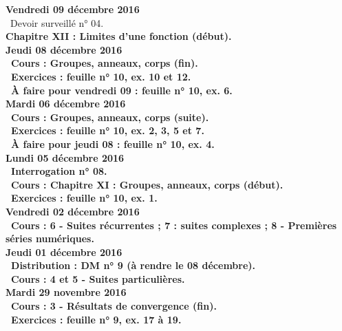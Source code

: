 \documentclass[12pt,a4paper]{article}
\begin{document}
\noindent\textbf{Vendredi 09 décembre 2016}\\
\bu\ Devoir surveillé n° 04.\\
\bf Chapitre XII \rm : Limites d'une fonction (début).\vspace{.4cm}\\

\noindent\textbf{Jeudi 08 décembre 2016}\\
\bu\ Cours : Groupes, anneaux, corps (fin).\\
\bu\ Exercices : feuille n° 10, ex. 10 et 12.\\
\bu\ À faire pour vendredi 09 : feuille n° 10, ex. 6.\vspace{.4cm}\\

\noindent\textbf{Mardi 06 décembre 2016} \\
\bu\ Cours : Groupes, anneaux, corps (suite).\\
\bu\ Exercices : feuille n° 10, ex. 2, 3, 5 et 7.\\
\bu\ À faire pour jeudi 08 : feuille n° 10, ex. 4.\vspace{.4cm}\\

\noindent\textbf{Lundi 05 décembre 2016} \\
\bu\ Interrogation n° 08.\\
\bu\ Cours : \bf Chapitre XI \rm : Groupes, anneaux, corps (début).\\
\bu\ Exercices : feuille n° 10, ex. 1.\vspace{.4cm}\\
  
\noindent\textbf{Vendredi 02 décembre 2016}\\
\bu\ Cours : 6 - Suites récurrentes ; 7 : suites complexes ; 8 - Premières séries numériques.\vspace{.4cm}\\
  
\noindent\textbf{Jeudi 01 décembre 2016}\\
\bu\ Distribution : DM n° 9 (à rendre le 08 décembre).\\
\bu\ Cours : 4 et 5 - Suites particulières.\vspace{.4cm}\\

\noindent\textbf{Mardi 29 novembre 2016}\\
\bu\ Cours : 3 - Résultats de convergence (fin).\\
\bu\ Exercices : feuille n° 9, ex. 17 à 19.\vspace{.4cm}\\
\end{document}
